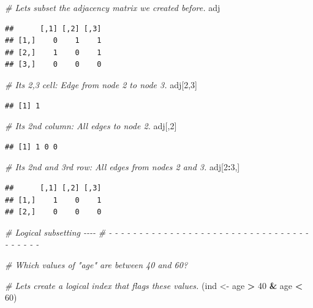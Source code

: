 \documentclass[
]{book}
\newenvironment{Shaded}{\begin{snugshade}}{\end{snugshade}}
\newcommand{\CommentTok}[1]{\textcolor[rgb]{0.56,0.35,0.01}{\textit{#1}}}
\newcommand{\DecValTok}[1]{\textcolor[rgb]{0.00,0.00,0.81}{#1}}
\newcommand{\NormalTok}[1]{#1}
\newcommand{\OtherTok}[1]{\textcolor[rgb]{0.56,0.35,0.01}{#1}}
\newcommand{\SpecialCharTok}[1]{\textcolor[rgb]{0.81,0.36,0.00}{\textbf{#1}}}
\begin{document}
\begin{Shaded}
\begin{Highlighting}[]
\CommentTok{\# Let\textquotesingle{}s subset the adjacency matrix we created before.}
\NormalTok{adj}
\end{Highlighting}
\end{Shaded}

\begin{verbatim}
##      [,1] [,2] [,3]
## [1,]    0    1    1
## [2,]    1    0    1
## [3,]    0    0    0
\end{verbatim}

\begin{Shaded}
\begin{Highlighting}[]
\CommentTok{\# Its 2,3 cell: Edge from node 2 to node 3.}
\NormalTok{adj[}\DecValTok{2}\NormalTok{,}\DecValTok{3}\NormalTok{]}
\end{Highlighting}
\end{Shaded}

\begin{verbatim}
## [1] 1
\end{verbatim}

\begin{Shaded}
\begin{Highlighting}[]
\CommentTok{\# Its 2nd column: All edges to node 2.}
\NormalTok{adj[,}\DecValTok{2}\NormalTok{]}
\end{Highlighting}
\end{Shaded}

\begin{verbatim}
## [1] 1 0 0
\end{verbatim}

\begin{Shaded}
\begin{Highlighting}[]
\CommentTok{\# Its 2nd and 3rd row: All edges from nodes 2 and 3.}
\NormalTok{adj[}\DecValTok{2}\SpecialCharTok{:}\DecValTok{3}\NormalTok{,]}
\end{Highlighting}
\end{Shaded}

\begin{verbatim}
##      [,1] [,2] [,3]
## [1,]    1    0    1
## [2,]    0    0    0
\end{verbatim}

\begin{Shaded}
\begin{Highlighting}[]
\CommentTok{\# Logical subsetting                                                          {-}{-}{-}{-}}
\CommentTok{\# {-} {-} {-} {-} {-} {-} {-} {-} {-} {-} {-} {-} {-} {-} {-} {-} {-} {-} {-} {-} {-} {-} {-} {-} {-} {-} {-} {-} {-} {-} {-} {-} {-} {-} {-} {-} {-} {-} {-} }

\CommentTok{\# Which values of "age" are between 40 and 60?}

\CommentTok{\# Let\textquotesingle{}s create a logical index that flags these values.}
\NormalTok{(ind }\OtherTok{\textless{}{-}}\NormalTok{ age }\SpecialCharTok{\textgreater{}} \DecValTok{40} \SpecialCharTok{\&}\NormalTok{ age }\SpecialCharTok{\textless{}} \DecValTok{60}\NormalTok{)}
\end{Highlighting}
\end{Shaded}
\end{document}
